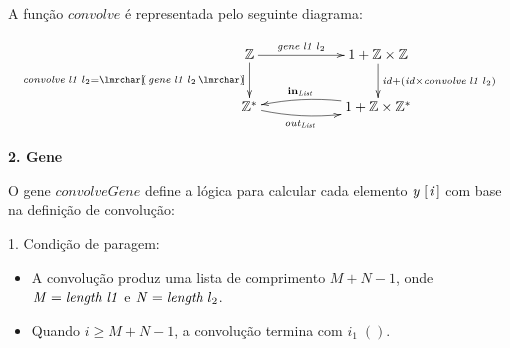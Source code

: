 \documentclass[11pt, a4paper, fleqn]{article}
\newcommand{\Conid}[1]{\mathit{#1}}
\newcommand{\Varid}[1]{\mathit{#1}}
\renewcommand{\geq}{\geqslant}
\begin{document}
A função \ensuremath{\Varid{convolve}} é representada pelo seguinte diagrama:

\begin{eqnarray*}
\xymatrix@C=2cm{
    \ensuremath{\mathbb{Z}}
           \ar[d]_-{\ensuremath{\Varid{convolve}\;\Varid{l1}\;l_2 \mathrel{=}\ana{\Varid{gene}\;\Varid{l1}\;l_2 }}}
            \ar[r]^-{\ensuremath{\Varid{gene}\;\Varid{l1}\;l_2 }} 
&
    \ensuremath{\mathrm{1}\mathbin{+}\mathbb{Z}} \times \ensuremath{\mathbb{Z}}
           \ar[d]^{\ensuremath{\Varid{id}\mathbin{+}(\Varid{id}} \times \ensuremath{\Varid{convolve}\;\Varid{l1}\;l_2 })}
\\
     \ensuremath{\mathbb{Z}}^*
            \ar@/_/[r]_-{\ensuremath{\Varid{out}}_\ensuremath{\Conid{List}}} 
&
     \ensuremath{\mathrm{1}\mathbin{+}\mathbb{Z}} \times \ensuremath{\mathbb{Z}}^*
           \ar@/_/[l]_-{\ensuremath{\mathbf{in}}_\ensuremath{\Conid{List}}}
}
\end{eqnarray*}

\textbf{2. Gene}

O gene \ensuremath{\Varid{convolveGene}} define a lógica para calcular cada elemento \ensuremath{\Varid{y}\;[\mskip1.5mu \Varid{i}\mskip1.5mu]} com base na definição de convolução:

1. Condição de paragem:
\begin{itemize}
\item A convolução produz uma lista de comprimento \ensuremath{\Conid{M}\mathbin{+}\Conid{N}\mathbin{-}\mathrm{1}}, onde \ensuremath{\Conid{M}\mathrel{=}\length \;\Varid{l1}} e \ensuremath{\Conid{N}\mathrel{=}\length \;l_2 }.
\item Quando \ensuremath{\Varid{i}\geq \Conid{M}\mathbin{+}\Conid{N}\mathbin{-}\mathrm{1}}, a convolução termina com \ensuremath{i_1\;()}.
\end{itemize}
\end{document}
